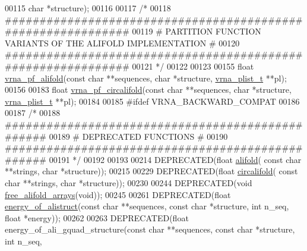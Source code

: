 \begin{DoxyCode}
00115                   \textcolor{keywordtype}{char} *structure);
00116 
00117 \textcolor{comment}{/*}
00118 \textcolor{comment}{#############################################################}
00119 \textcolor{comment}{# PARTITION FUNCTION VARIANTS OF THE ALIFOLD IMPLEMENTATION #}
00120 \textcolor{comment}{#############################################################}
00121 \textcolor{comment}{*/}
00122 
00123 
00155 \textcolor{keywordtype}{float} \hyperlink{group__consensus__pf__fold_ga87296fe8e93bb5261783a8db901a5c64}{vrna\_pf\_alifold}(\textcolor{keyword}{const} \textcolor{keywordtype}{char} **sequences, \textcolor{keywordtype}{char} *structure, 
      \hyperlink{group__data__structures_structvrna__plist__s}{vrna\_plist\_t} **pl);
00156 
00183 \textcolor{keywordtype}{float} \hyperlink{group__consensus__pf__fold_ga017209394a4c1e68d96cd47e61d16d25}{vrna\_pf\_circalifold}(\textcolor{keyword}{const} \textcolor{keywordtype}{char} **sequences, \textcolor{keywordtype}{char} *structure, 
      \hyperlink{group__data__structures_structvrna__plist__s}{vrna\_plist\_t} **pl);
00184 
00185 \textcolor{preprocessor}{#ifdef  VRNA\_BACKWARD\_COMPAT}
00186 
00187 \textcolor{comment}{/*}
00188 \textcolor{comment}{#################################################}
00189 \textcolor{comment}{# DEPRECATED FUNCTIONS                          #}
00190 \textcolor{comment}{#################################################}
00191 \textcolor{comment}{*/}
00192 
00193 
00214 DEPRECATED(\textcolor{keywordtype}{float} \hyperlink{group__consensus__mfe__fold_ga4cf00f0659e5f0480335d69e797f05b1}{alifold}( \textcolor{keyword}{const} \textcolor{keywordtype}{char} **strings, \textcolor{keywordtype}{char} *structure));
00215 
00229 DEPRECATED(\textcolor{keywordtype}{float} \hyperlink{group__consensus__mfe__fold_gadbd3b0b1c144cbfb4efe704b2b260f96}{circalifold}( \textcolor{keyword}{const} \textcolor{keywordtype}{char} **strings, \textcolor{keywordtype}{char} *structure));
00230 
00244 DEPRECATED(\textcolor{keywordtype}{void} \hyperlink{group__consensus__mfe__fold_ga72095e4554b5d577250ea14c42acc49e}{free\_alifold\_arrays}(\textcolor{keywordtype}{void}));
00245 
00261 DEPRECATED(\textcolor{keywordtype}{float} \hyperlink{group__consensus__fold_ga1c48869c03b49a342bf4cbdd61900081}{energy\_of\_alistruct}(\textcolor{keyword}{const} \textcolor{keywordtype}{char} **sequences, \textcolor{keyword}{const} \textcolor{keywordtype}{char} *structure, \textcolor{keywordtype}{int} 
      n\_seq, \textcolor{keywordtype}{float} *energy));
00262 
00263 DEPRECATED(\textcolor{keywordtype}{float} energy\_of\_ali\_gquad\_structure(\textcolor{keyword}{const} \textcolor{keywordtype}{char} **sequences, \textcolor{keyword}{const} \textcolor{keywordtype}{char} *structure, \textcolor{keywordtype}{int} n\_seq, \textcolor{keywordtype}{
}
\end{DoxyCode}
